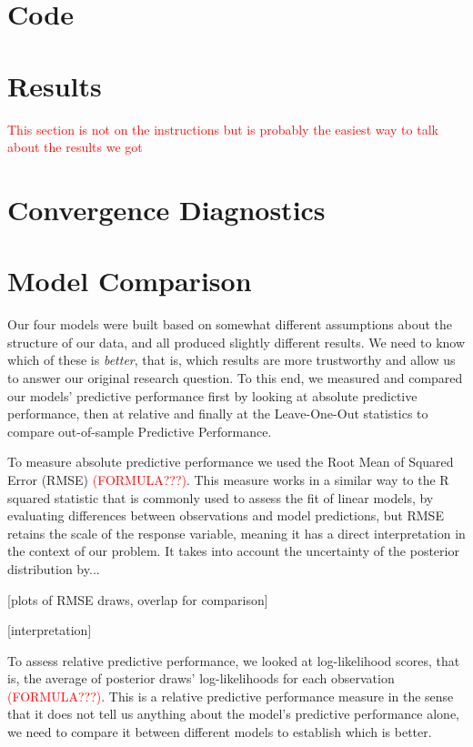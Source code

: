 \documentclass[12pt]{article}
\begin{document}
\section{Code}


\section{Results}

\textcolor{red}{This section is not on the instructions but is probably the easiest way to talk about the results we got }




\section{Convergence Diagnostics}



\section{Model Comparison}


Our four models were built based on somewhat different assumptions about the structure of our data, and all produced slightly different results. We need to know which of these is \textit{better}, that is, which results are more trustworthy and allow us to answer our original research question.
To this end, we measured and compared our models' predictive performance first by looking at absolute predictive performance, then at relative and finally at the Leave-One-Out statistics to compare out-of-sample Predictive Performance.


To measure absolute predictive performance we used the Root Mean of Squared Error (RMSE)
\textcolor{red}{(FORMULA???)}.
This measure works in a similar way to the R squared statistic that is commonly used to assess the fit of linear models, by evaluating differences between observations and model predictions, but RMSE retains the scale of the response variable, meaning it has a direct interpretation in the context of our problem.
It takes into account the uncertainty of the posterior distribution by...


[plots of RMSE draws, overlap for comparison]

[interpretation]



To assess relative predictive performance, we looked at log-likelihood scores, that is, the average of posterior draws' log-likelihoods for each observation
\textcolor{red}{(FORMULA???)}. 
This is a relative predictive performance measure in the sense that it does not tell us anything about the model's predictive performance alone, we need to compare it between different models to establish which is better.
 
\end{document}

